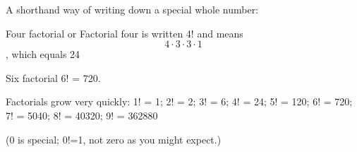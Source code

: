 A shorthand way of writing down a special whole number:

\par
Four factorial or Factorial four is written 4! and means  \[4\cdot 3\cdot 3\cdot 1\], which equals 24
\par
Six factorial 6! = 720.

\par
Factorials grow very quickly: 
1! = 1; 2! = 2; 3! = 6; 4! = 24; 5! = 120; 6! = 720; 7! = 5040; 8! = 40320; 9! = 362880
\par
(0 is special; 0!=1, not zero as you might expect.)